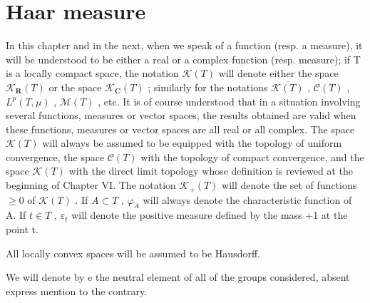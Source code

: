 \chapter{Haar measure}

In this chapter and in the next, when we speak of a function (resp. a measure), it will be understood to be either a real or a complex function (resp. measure); if T is a locally compact space, the notation \(\mathcal{K}(T)\) will denote either the space \(\mathcal{K}_{\mathbf{R}}(T)\) or the space \(\mathcal{K}_{\mathbf{C}}(T)\) ; similarly for the notations \(\overline{\mathcal{K}(T)}\) , \(\mathcal{C}(T)\) , \(L^{p}(T,\mu)\) , \(\mathcal{M}(T)\) , etc. It is of course understood that in a situation involving several functions, measures or vector spaces, the results obtained are valid when these functions, measures or vector spaces are all real or all complex. The space \(\overline{\mathcal{K}(T)}\) will always be assumed to be equipped with the topology of uniform convergence, the space \(\mathcal{C}(T)\) with the topology of compact convergence, and the space \(\mathcal{K}(T)\) with the direct limit topology whose definition is reviewed at the beginning of Chapter VI. The notation \(\mathcal{K}_{+}(T)\) will denote the set of functions \(\geqslant0\) of \(\mathcal{K}(T)\) . If \(A\subset T\) , \(\varphi_{A}\) will always denote the characteristic function of A. If \(t\in T\) , \(\varepsilon_{t}\) will denote the positive measure defined by the mass +1 at the point t.

All locally convex spaces will be assumed to be Hausdorff.

We will denote by e the neutral element of all of the groups considered, absent express mention to the contrary.

